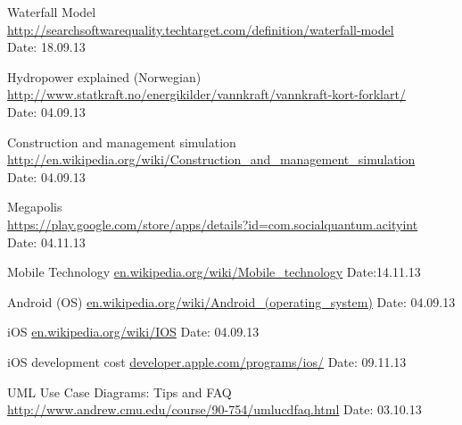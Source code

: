 \begin{thebibliography}{99}
	Waterfall Model \\
	\href {http://searchsoftwarequality.techtarget.com/definition/waterfall-model}{http://searchsoftwarequality.techtarget.com/definition/waterfall-model} \\
	Date: 18.09.13

	Hydropower explained (Norwegian) \\
	\href {http://www.statkraft.no/energikilder/vannkraft/vannkraft-kort-forklart/}{http://www.statkraft.no/energikilder/vannkraft/vannkraft-kort-forklart/} \\
	Date: 04.09.13

	Construction and management simulation \\
	\href {http://en.wikipedia.org/wiki/Construction_and_management_simulation}{http://en.wikipedia.org/wiki/Construction\_and\_management\_simulation} \\
	Date: 04.09.13

	Megapolis \\
	\href {https://play.google.com/store/apps/details?id=com.socialquantum.acityint}{https://play.google.com/store/apps/details?id=com.socialquantum.acityint} \\
	Date: 04.11.13

	Mobile Technology\newline
	\href{http://en.wikipedia.org/wiki/Mobile_technology}{en.wikipedia.org/wiki/Mobile\_technology}\newline
	Date:14.11.13

	Android (OS)\newline
	\href {http://en.wikipedia.org/wiki/Android\_(operating_system)}{en.wikipedia.org/wiki/Android\_(operating\_system)}\newline
	Date: 04.09.13

	iOS\newline
	\href {http://en.wikipedia.org/wiki/IOS}{en.wikipedia.org/wiki/IOS}\newline
	Date: 04.09.13

	iOS development cost\newline
	\href {https://developer.apple.com/programs/ios/}{developer.apple.com/programs/ios/}\newline
	Date: 09.11.13

	UML Use Case Diagrams: Tips and FAQ
	\href {http://www.andrew.cmu.edu/course/90-754/umlucdfaq.html}{http://www.andrew.cmu.edu/course/90-754/umlucdfaq.html}
	Date: 03.10.13


\end{thebibliography}
